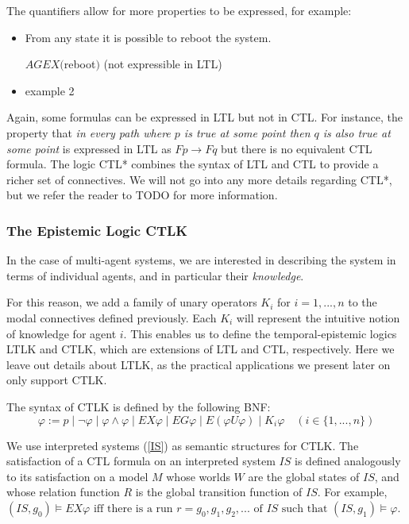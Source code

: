 \documentclass[12]{article}
\newenvironment{definition}[1][Definition]{\begin{trivlist}
\item[\hskip \labelsep {\bfseries #1}]}{\end{trivlist}}
\begin{document}
The quantifiers allow for more properties to be expressed, for example:
\begin{itemize}
\item From any state it is possible to reboot the system.

$AGEX($reboot$)$ \quad (not expressible in LTL)

\item example 2


\end{itemize}

Again, some formulas can be expressed in LTL but not in CTL. For instance, the property that \textit{in every path where $p$ is true at some point then $q$ is also true at some point} is expressed in LTL as $Fp \rightarrow Fq $ but there is no equivalent CTL formula.
 The logic CTL* combines the syntax of LTL and CTL to provide a richer set of connectives. We will not go into any more details regarding CTL*, but we refer the reader to TODO for more information. 

\subsubsection{The Epistemic Logic CTLK}

In the case of multi-agent systems, we are interested in describing the system in terms of individual agents, and in particular their \textit{knowledge}. 

For this reason, we add a family of unary operators $K_i$ for $i = 1, ..., n$ to the modal connectives defined previously. Each $K_i$ will represent the intuitive notion of knowledge for agent $i$. 
This enables us to define the temporal-epistemic logics LTLK and CTLK, which are extensions of LTL and CTL, respectively. Here we leave out details about LTLK, as the practical applications we present later on only support CTLK. 



\begin{definition} 
The syntax of CTLK is defined by the following BNF: 
$$ \varphi := p \mid \lnot \varphi \mid \varphi \land \varphi \mid EX\varphi \mid EG\varphi \mid E(\varphi U \varphi) \mid  K_i\varphi \quad (i \in \{1, ..., n\})$$
\end{definition}  

We use interpreted systems (\ref{IS}) as semantic structures for CTLK. The satisfaction of a CTL formula on an interpreted system $IS$ is defined analogously to its satisfaction on a model $M$ whose worlds $W$ are the global states of $IS$, and whose relation function $R$ is the global transition function of $IS$. 
For example, $(IS, g_0) \models EX\varphi \mbox{  iff there is a run } r = g_0, g_1, g_2, ... \mbox{ of $IS$ such that } (IS, g_1) \models \varphi$.
\end{document}
